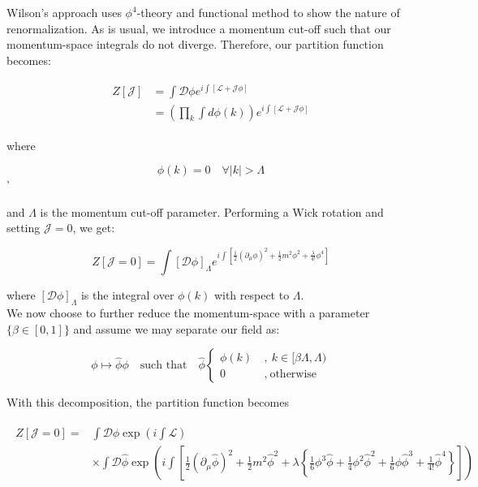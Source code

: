 \documentclass[10pt]{report}
\begin{document}
	Wilson's approach uses $\phi^4$-theory and functional method to show the nature of renormalization. As is usual, we introduce a momentum cut-off such that our momentum-space integrals do not diverge. Therefore, our partition function becomes:
	
	\begin{align}
		\begin{split}
		Z[\mathcal{J}] &= \int\mathcal{D}\phi e^{i\int\left[\mathcal{L} + \mathcal{J}\phi\right]} \\
		&= \left( \prod_k\int d\phi(k) \right)e^{i\int\left[\mathcal{L} + \mathcal{J}\phi\right]}
		\end{split}
	\end{align}
	
	where
	
	\begin{equation}
		\phi(k) = 0 \quad\forall |k|>\Lambda
	\end{equation}'
	
	and $\Lambda$ is the momentum cut-off parameter. Performing a Wick rotation and setting $\mathcal{J} = 0$, we get:
	
	\begin{equation}
		Z[\mathcal{J}=0] = \int\left[\mathcal{D}\phi\right]_\Lambda e^{i\int\left[ \frac{1}{2}\left(\partial_\mu\phi\right)^2 + \frac{1}{2}m^2\phi^2 + \frac{\lambda}{4!}\phi^4\right]}
	\end{equation}
	
	where $\left[\mathcal{D}\phi\right]_\Lambda$ is the integral over $\phi(k)$ with respect to $\Lambda$.\\
	We now choose to further reduce the momentum-space with a parameter $\{\beta\in[0,1]\}$ and assume we may separate our field as:
	
	\begin{equation}
		\phi \mapsto \hat{\phi}\phi \quad\text{such that}\quad \hat{\phi} \begin{cases}
		 \phi(k) \: &,\:k\in[\beta\Lambda,\Lambda) \\
		 0 \: &,\:\text{otherwise}
		\end{cases}
	\end{equation}
	
	With this decomposition, the partition function becomes
	
	\begin{align}
		\begin{split}
			Z[\mathcal{J}=0] = &\int\mathcal{D}\phi \exp\left(i\int\mathcal{L}\right) \\
			&\times\int\mathcal{D}\hat{\phi} \exp\left(i\int\left[ \frac{1}{2}\left(\partial_\mu\hat{\phi}\right)^2 + \frac{1}{2}m^2\hat{\phi}^2 + \lambda\left\{ \frac{1}{6}\phi^3\hat{\phi} + \frac{1}{4}\phi^2\hat{\phi}^2 + \frac{1}{6}\phi\hat{\phi}^3 + \frac{1}{4!}\hat{\phi}^4 \right\}\right]\right)
		\end{split}
	\end{align}
	
\end{document}
